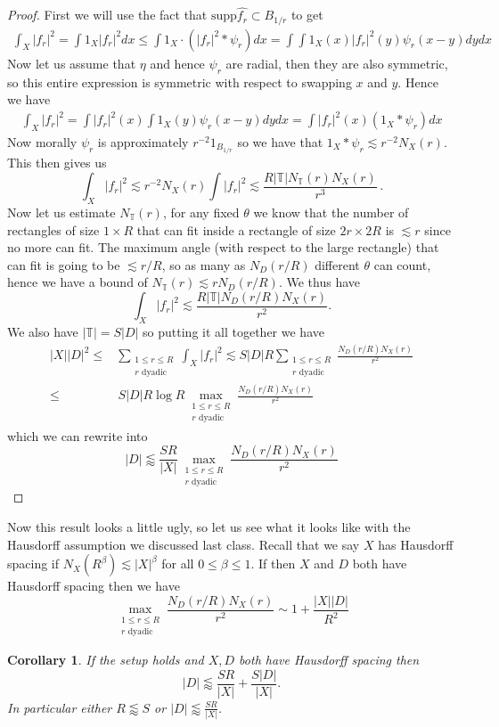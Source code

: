 \documentclass[12pt]{amsart}
\newtheorem{Corollary}[theorem]{Corollary}
\newcommand{\spp}{\textrm{supp}}
\newcommand{\TT}{\mathbb{T}}
\begin{document}
\begin{proof}
    First we will use the fact that $\spp \hat{f_r} \subset B_{1/r}$ to get
    \begin{align*}
        \int_X |f_r|^2 = \int 1_X |f_r|^2 dx
        \leq \int 1_X \cdot (|f_r|^2 * \psi_r) dx
        = \int \int 1_X (x) |f_r|^2 (y) \psi_r (x - y) dy dx
    \end{align*}
    Now let us assume that $\eta$ and hence $\psi_r$ are radial, then they are also symmetric, so this entire expression is symmetric with respect to swapping $x$ and $y$. Hence we have
    \begin{align*}
        \int_X |f_r|^2 = \int |f_r|^2 (x) \int 1_X (y) \psi_r (x - y) dy dx
        = \int |f_r|^2 (x) (1_X * \psi_r) dx
    \end{align*}
    Now morally $\psi_r$ is approximately $r^{-2}1_{B_{1/r}}$ so we have that $1_X * \psi_r \lesssim r^{-2} N_{X} (r)$. This then gives us
    \[
        \int_X |f_r|^2 \lesssim r^{-2} N_{X} (r) \int |f_r|^2 \lesssim \frac{R |\TT| N_{\TT} (r) N_{X} (r)}{r^3}\, .
    \]
    Now let us estimate $N_\TT (r)$, for any fixed $\theta$ we know that the number of rectangles of size $1 \times R$ that can fit inside a rectangle of size $2r \times 2R$ is $\lesssim r$ since no more can fit. The maximum angle (with respect to the large rectangle) that can fit is going to be $\lesssim r/R$, so as many as $N_D (r/R)$ different $\theta$ can count, hence we have a bound of $N_\TT (r) \lesssim r N_D (r/R)$. We thus have
    \[
        \int_X |f_r|^2 \lesssim \frac{R |\TT| N_{D}(r/R) N_{X} (r)}{r^2}.
    \]
    We also have $|\TT| = S |D|$ so putting it all together we have
    \begin{align*}
        |X| |D|^2 \leq& \sum_{\substack{1 \leq r \leq R\\ r \text{ dyadic}}} \int_X |f_r|^2 \lesssim S |D|R \sum_{\substack{1 \leq r \leq R\\ r \text{ dyadic}}} \frac{ N_{D}(r/R) N_{X} (r)}{r^2}
        \\ \leq& \, S |D|R \log {R}\max_{\substack{1 \leq r \leq R\\ r \text{ dyadic}}} \frac{ N_{D}(r/R) N_{X} (r)}{r^2}
    \end{align*}
    which we can rewrite into
    \[
        |D| \lessapprox \frac{S R}{|X|} \max_{\substack{1 \leq r \leq R\\ r \text{ dyadic}}} \frac{ N_{D}(r/R) N_{X} (r)}{r^2}
    \]
\end{proof}

Now this result looks a little ugly, so let us see what it looks like with the Hausdorff assumption we discussed last class.
Recall that we say $X$ has Hausdorff spacing if $N_X (R^\beta) \lesssim |X|^\beta$ for all $0 \leq \beta \leq 1$. If then $X$ and $D$ both have Hausdorff spacing then we have
\[
    \max_{\substack{1 \leq r \leq R\\ r \text{ dyadic}}} \frac{ N_{D}(r/R) N_{X} (r)}{r^2} \sim 1 + \frac{|X||D|}{R^2}
\]
\begin{Corollary}
    If the setup holds and $X,D$ both have Hausdorff spacing then
    \[
        |D| \lessapprox \frac{S R}{|X|} + \frac{S |D|}{|X|}.
    \]
    In particular either $R \lessapprox S$ or $|D| \lessapprox \frac{S R}{|X|}$.
\end{Corollary}
\end{document}
